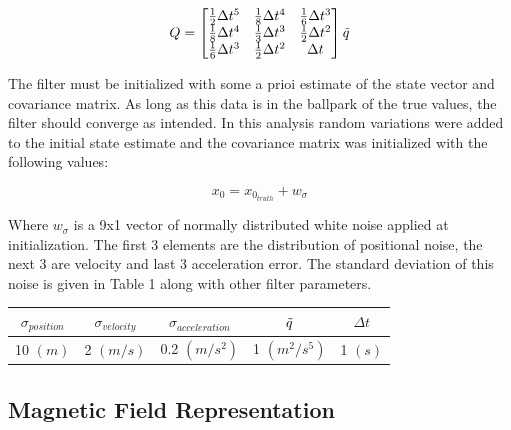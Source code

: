 \documentclass[conf]{new-aiaa}
\begin{document}
\begin{equation}
    Q = \begin{bmatrix} \frac{1}{2}\Delta t^{5} & \frac{1}{8}\Delta t^{4} & \frac{1}{6}\Delta t^{3} \\ \frac{1}{8}\Delta t^{4} & \frac{1}{3}\Delta t^{3} & \frac{1}{2}\Delta t^{2} \\ \frac{1}{6}\Delta t^{3} & \frac{1}{2}\Delta t^{2} & \Delta t \end{bmatrix}\Tilde{q}
\end{equation}

The filter must be initialized with some a prioi estimate of the state vector and covariance matrix. As long as this data is in the ballpark of the true values, the filter should converge as intended. In this analysis random variations were added to the initial state estimate and the covariance matrix was initialized with the following values:

\begin{equation}
    x_{0} = x_{0_{truth}} + w_{\sigma}
\end{equation}

Where \(w_{\sigma}\) is a 9x1 vector of normally distributed white noise applied at initialization. The first 3 elements are the distribution of positional noise, the next 3 are velocity and last 3 acceleration error. The standard deviation of this noise is given in Table 1 along with other filter parameters. 

\begin{center}
\begin{tabular}{||c c c | c | c||} 
 \hline
 $\sigma_{position}$ & $\sigma_{velocity}$ & $\sigma_{acceleration}$ & $\Tilde{q}$ & $\Delta t$ \\ [0.5ex] 
 \hline
  10 \((m)\) & 2 \((m/s)\) & 0.2 \((m/s^{2})\) & 1 $(m^{2}/s^{5})$ & 1 $(s)$ \\ [1ex] 
 \hline
\end{tabular}
\end{center}

\subsection{Magnetic Field Representation} %
\end{document}
